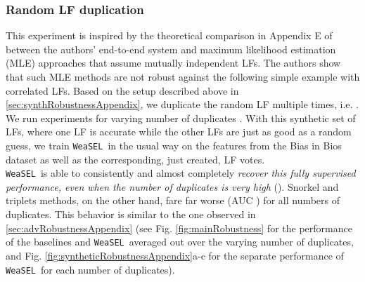 \documentclass{article}
\newcommand{\weasel}{\texttt{WeaSEL}}\newcommand{\brackets}[1]{\left( #1 \right)}
\begin{document}
\subsubsection{Random LF duplication}
\label{sec:synthRobustnessDuplicatesAppendix}
This experiment is inspired by the theoretical comparison in Appendix E of \cite{MaxMIG} between the authors' end-to-end system and maximum likelihood estimation (MLE) approaches that assume mutually independent LFs. 
The authors show that such MLE methods are not robust against the following simple example with correlated LFs.
Based on the setup described above in \ref{sec:synthRobustnessAppendix}, we duplicate the random LF  multiple times, i.e. . 
We run experiments for varying number of duplicates .
With this synthetic set of  LFs, where one LF is  accurate while the other  LFs are just as good as a random guess, we train \weasel\ in the usual way on the features from the Bias in Bios dataset as well as the corresponding, just created, LF votes.
\\
\weasel\ is able to consistently and almost completely \emph{recover this fully supervised performance, even when the number of duplicates is very high} (). 
Snorkel and triplets methods, on the other hand, fare far worse (AUC ) for all numbers of duplicates. This behavior is similar to the one observed in \ref{sec:advRobustnessAppendix} (see Fig. \ref{fig:mainRobustness} for the performance of the baselines and \weasel\ averaged out over the varying number of duplicates, and Fig. \ref{fig:syntheticRobustnessAppendix}a-c for the separate performance of \weasel\ for each number of duplicates).
\end{document}
